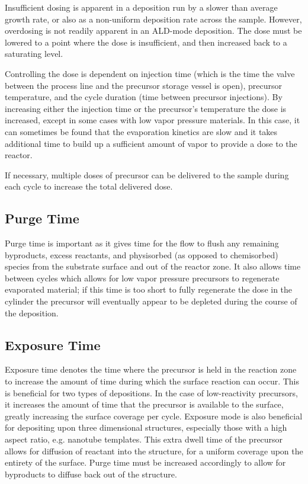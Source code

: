 Insufficient dosing is apparent in a deposition run by a slower than average growth rate, or also as a non-uniform deposition rate across the sample. However, overdosing is not readily apparent in an ALD-mode deposition. The dose must be lowered to a point where the dose is insufficient, and then increased back to a saturating level. 

Controlling the dose is dependent on injection time (which is the time the valve between the process line and the precursor storage vessel is open), precursor temperature, and the cycle duration (time between precursor injections). By increasing either the injection time or the precursor's temperature the dose is increased, except in some cases with low vapor pressure materials. In this case, it can sometimes be found that the evaporation kinetics are slow and it takes additional time to build up a sufficient amount of vapor to provide a dose to the reactor. 

If necessary, multiple doses of precursor can be delivered to the sample during each cycle to increase the total delivered dose.


\subsection{Purge Time}

Purge time is important as it gives time for the  flow to flush any remaining byproducts, excess reactants, and physisorbed (as opposed to chemisorbed) species from the substrate surface and out of the reactor zone. It also allows time between cycles which allows for low vapor pressure precursors to regenerate evaporated material; if this time is too short to fully regenerate the dose in the cylinder the precursor will eventually appear to be depleted during the course of the deposition. 


\subsection{Exposure Time}

Exposure time denotes the time where the precursor is held in the reaction zone to increase the amount of time during which the surface reaction can occur. This is beneficial for two types of depositions. In the case of low-reactivity precursors, it increases the amount of time that the precursor is available to the surface, greatly increasing the surface coverage per cycle. Exposure mode is also beneficial for depositing upon three dimensional structures, especially those with a high aspect ratio, e.g. nanotube templates. This extra dwell time of the precursor allows for diffusion of reactant into the structure, for a uniform coverage upon the entirety of the surface. Purge time must be increased accordingly to allow for byproducts to diffuse back out of the structure. 

